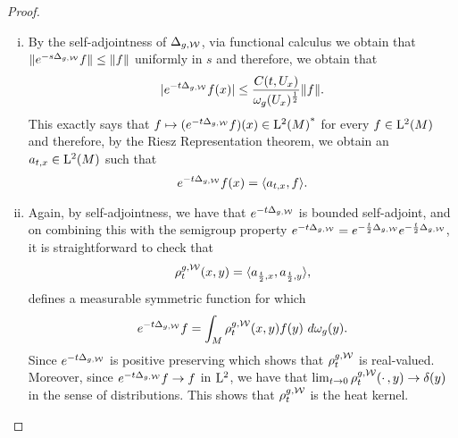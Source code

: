 \documentclass[a4paper, 12pt]{amsart}
\begin{document}
\begin{proof}
\begin{enumerate}[(i)]
\item By the self-adjointness of $\Delta_{g,\mathcal{W}}$, via functional calculus 
	we obtain that $\| e^{-s\Delta_{g,\mathcal{W}}}f \| \leq \| f \|$
	uniformly in $s$  and therefore, we obtain that
	$$|e^{-t \Delta_{g,\mathcal{W}}}f(x)| \leq 
		\frac{C(t,U_x)}{\omega_g(U_x)^{\frac{1}{2}}} \| f \|.$$
	This exactly says that $f \mapsto (e^{-t\Delta_{g,\mathcal{W}}}f)(x) \in {{\rm L}^{2}_{\rm {}}(M)}^\ast$
	for every $f \in {\rm L}^{2}_{\rm {}}(M)$ and therefore, by the Riesz Representation theorem,
	we obtain an $a_{t,x} \in {\rm L}^{2}_{\rm {}}(M)$ such that
	$$ e^{-t \Delta_{g,\mathcal{W}}}f(x) = \langle a_{t,x},f \rangle.$$

\item Again, by self-adjointness, we have that $e^{-t \Delta_{g,\mathcal{W}}}$
	is bounded self-adjoint, and
	on combining this with the semigroup property 
	$e^{-t\Delta_{g,\mathcal{W}}} = e^{-\frac{t}{2} \Delta_{g,\mathcal{W}}}e^{-\frac{t}{2} \Delta_{g,\mathcal{W}}}$, 
	it is straightforward to check that 
		$$\rho^{g,\mathcal{W}}_t(x,y) = \langle a_{\frac{t}{2}, x}, a_{\frac{t}{2}, y} \rangle,$$
	defines a measurable symmetric function for which 
	$$e^{-t \Delta_{g,\mathcal{W}}}f = \int_{M} \rho^{g,\mathcal{W}}_t(x,y)f(y)\ d\omega_g(y).$$
	Since $e^{-t \Delta_{g,\mathcal{W}}}$
	is positive preserving which shows that $\rho_t^{g,\mathcal{W}}$
	is real-valued. Moreover, since $e^{-t\Delta_{g,\mathcal{W}}}f \to f$
	in ${\rm L}^{2}_{\rm {}}$, we have that 
	$\lim_{t \to 0} \rho^{g,\mathcal{W}}_t(\cdotp,y) \to  \delta(y)$
	in the sense of distributions. This
	shows that $\rho^{g,\mathcal{W}}_t$ is the heat kernel.


\end{enumerate}
\end{proof}
\end{document}
